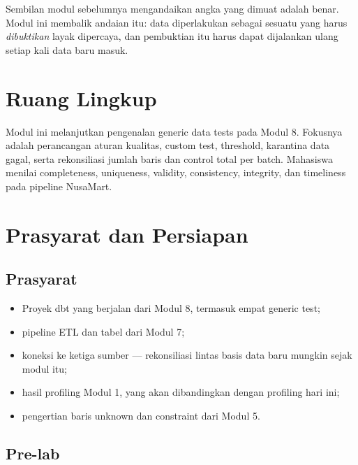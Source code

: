 Sembilan modul sebelumnya mengandaikan angka yang dimuat adalah benar. Modul ini
membalik andaian itu: data diperlakukan sebagai sesuatu yang harus
\emph{dibuktikan} layak dipercaya, dan pembuktian itu harus dapat dijalankan
ulang setiap kali data baru masuk.

\section{Ruang Lingkup}

Modul ini melanjutkan pengenalan generic data tests pada Modul 8. Fokusnya
adalah perancangan aturan kualitas, custom test, threshold, karantina data
gagal, serta rekonsiliasi jumlah baris dan control total per batch. Mahasiswa
menilai completeness, uniqueness, validity, consistency, integrity, dan
timeliness pada pipeline NusaMart.

\section{Prasyarat dan Persiapan}

\subsection{Prasyarat}

\begin{itemize}
  \item Proyek dbt yang berjalan dari Modul 8, termasuk empat generic test;
  \item pipeline ETL dan tabel  dari Modul 7;
  \item koneksi  ke ketiga sumber --- rekonsiliasi
        lintas basis data baru mungkin sejak modul itu;
  \item hasil profiling Modul 1, yang akan dibandingkan dengan profiling hari
        ini;
  \item pengertian baris unknown dan constraint dari Modul 5.
\end{itemize}

\subsection{Pre-lab}

